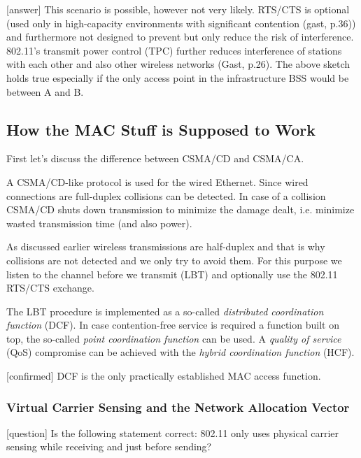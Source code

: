 \documentclass{article}
\begin{document}
	\bigskip
	\color{red}
	[answer] This scenario is possible, however not very likely. RTS/CTS is optional (used only in high-capacity environments with significant contention (gast, p.36)) and furthermore not designed to prevent but only reduce the risk of interference. 802.11's transmit power control (TPC) further reduces interference of stations with each other and also other wireless networks (Gast, p.26). The above sketch holds true especially if the only access point in the infrastructure BSS would be between A and B.
	\color{black}
	
	\subsection{How the MAC Stuff is Supposed to Work}
	
	First let's discuss the difference between CSMA/CD and CSMA/CA.
	
	\medskip
	
	A CSMA/CD-like protocol is used for the wired Ethernet. Since wired connections are full-duplex collisions can be detected. In case of a collision CSMA/CD shuts down transmission to minimize the damage dealt, i.e. minimize wasted transmission time (and also power). 
	
	\medskip
	
	As discussed earlier wireless transmissions are half-duplex and that is why collisions are not detected and we only try to avoid them. For this purpose we listen to the channel before we transmit (LBT) and optionally use the 802.11 RTS/CTS exchange.
	
	\medskip
	
	The LBT procedure is implemented as a so-called \emph{distributed coordination function} (DCF). In case contention-free service is required a function built on top, the so-called \emph{point coordination function} can be used. A \emph{quality of service} (QoS) compromise can be achieved with the \emph{hybrid coordination function} (HCF).
	
	\medskip
	
	\color{red}
	[confirmed] DCF is the only practically established MAC access function.
	\color{black}
	
	\subsubsection{Virtual Carrier Sensing and the Network Allocation Vector}
	
	\color{blue}
	[question] Is the following statement correct: 802.11 only uses physical carrier sensing while receiving and just before sending?
	\color{black}
	
\end{document}
